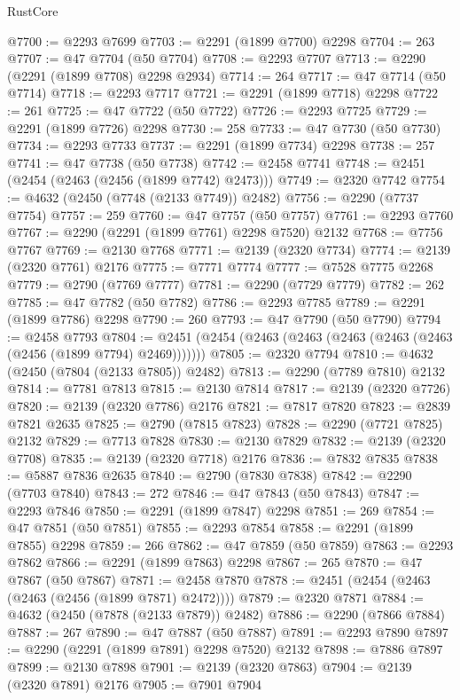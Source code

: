 \begin{lexlean}{RustCore}
\begin{coremodule}
@7700 := @2293 @7699
@7703 := @2291 (@1899 @7700) @2298
@7704 := 263
@7707 := @47 @7704 (@50 @7704)
@7708 := @2293 @7707
@7713 := @2290 (@2291 (@1899 @7708) @2298 @2934)
@7714 := 264
@7717 := @47 @7714 (@50 @7714)
@7718 := @2293 @7717
@7721 := @2291 (@1899 @7718) @2298
@7722 := 261
@7725 := @47 @7722 (@50 @7722)
@7726 := @2293 @7725
@7729 := @2291 (@1899 @7726) @2298
@7730 := 258
@7733 := @47 @7730 (@50 @7730)
@7734 := @2293 @7733
@7737 := @2291 (@1899 @7734) @2298
@7738 := 257
@7741 := @47 @7738 (@50 @7738)
@7742 := @2458 @7741
@7748 := @2451 (@2454 (@2463 (@2456 (@1899 @7742) @2473)))
@7749 := @2320 @7742
@7754 := @4632 (@2450 (@7748 (@2133 @7749)) @2482)
@7756 := @2290 (@7737 @7754)
@7757 := 259
@7760 := @47 @7757 (@50 @7757)
@7761 := @2293 @7760
@7767 := @2290 (@2291 (@1899 @7761) @2298 @7520) @2132
@7768 := @7756 @7767
@7769 := @2130 @7768
@7771 := @2139 (@2320 @7734)
@7774 := @2139 (@2320 @7761) @2176
@7775 := @7771 @7774
@7777 := @7528 @7775 @2268
@7779 := @2790 (@7769 @7777)
@7781 := @2290 (@7729 @7779)
@7782 := 262
@7785 := @47 @7782 (@50 @7782)
@7786 := @2293 @7785
@7789 := @2291 (@1899 @7786) @2298
@7790 := 260
@7793 := @47 @7790 (@50 @7790)
@7794 := @2458 @7793
@7804 := @2451 (@2454 (@2463 (@2463 (@2463 (@2463 (@2463 (@2456 (@1899 @7794) @2469)))))))
@7805 := @2320 @7794
@7810 := @4632 (@2450 (@7804 (@2133 @7805)) @2482)
@7813 := @2290 (@7789 @7810) @2132
@7814 := @7781 @7813
@7815 := @2130 @7814
@7817 := @2139 (@2320 @7726)
@7820 := @2139 (@2320 @7786) @2176
@7821 := @7817 @7820
@7823 := @2839 @7821 @2635
@7825 := @2790 (@7815 @7823)
@7828 := @2290 (@7721 @7825) @2132
@7829 := @7713 @7828
@7830 := @2130 @7829
@7832 := @2139 (@2320 @7708)
@7835 := @2139 (@2320 @7718) @2176
@7836 := @7832 @7835
@7838 := @5887 @7836 @2635
@7840 := @2790 (@7830 @7838)
@7842 := @2290 (@7703 @7840)
@7843 := 272
@7846 := @47 @7843 (@50 @7843)
@7847 := @2293 @7846
@7850 := @2291 (@1899 @7847) @2298
@7851 := 269
@7854 := @47 @7851 (@50 @7851)
@7855 := @2293 @7854
@7858 := @2291 (@1899 @7855) @2298
@7859 := 266
@7862 := @47 @7859 (@50 @7859)
@7863 := @2293 @7862
@7866 := @2291 (@1899 @7863) @2298
@7867 := 265
@7870 := @47 @7867 (@50 @7867)
@7871 := @2458 @7870
@7878 := @2451 (@2454 (@2463 (@2463 (@2456 (@1899 @7871) @2472))))
@7879 := @2320 @7871
@7884 := @4632 (@2450 (@7878 (@2133 @7879)) @2482)
@7886 := @2290 (@7866 @7884)
@7887 := 267
@7890 := @47 @7887 (@50 @7887)
@7891 := @2293 @7890
@7897 := @2290 (@2291 (@1899 @7891) @2298 @7520) @2132
@7898 := @7886 @7897
@7899 := @2130 @7898
@7901 := @2139 (@2320 @7863)
@7904 := @2139 (@2320 @7891) @2176
@7905 := @7901 @7904

\end{coremodule}
\end{lexlean}
